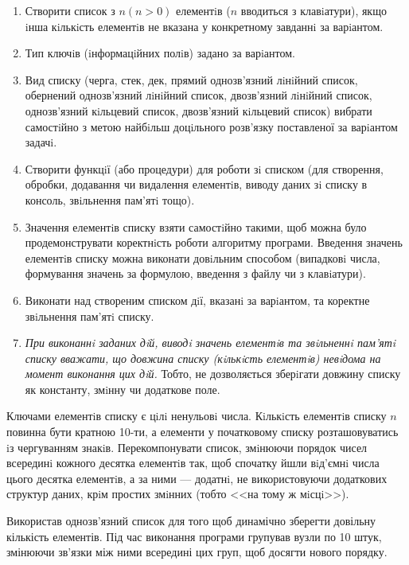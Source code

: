 
\def\basedir{/home/theammir/labs/asd/8/res}




\taskdesc%
\begin{enumerate}
  \item Створити список з $n (n > 0)$ елементiв ($n$ вводиться з клавiатури), якщо iнша кiлькiсть елементiв не вказана у конкретному завданнi за варiантом.
  \item Тип ключiв (iнформацiйних полiв) задано за варiантом.
  \item Вид списку (черга, стек, дек, прямий однозв’язний лiнiйний список, обернений однозв’язний лiнiйний список, 
    двозв’язний лiнiйний список, одно\-зв’язний кiльцевий список, двозв’язний кiльцевий список)
  вибрати самостiйно з метою найбiльш доцiльного розв’язку поставленої за варiантом задачi.
  \item Створити функцiї (або процедури) для роботи зi списком (для створення, обробки, додавання чи видалення елементiв, виводу даних зi списку в консоль, звiльнення пам’ятi тощо).
  \item Значення елементiв списку взяти самостiйно такими, щоб можна було продемонструвати коректнiсть роботи алгоритму програми.
    Введення значень елементiв списку можна виконати довiльним способом (випадковi числа, формування значень за формулою, введення з файлу чи з клавiатури).
  \item Виконати над створеним списком дiї, вказанi за варiантом, та коректне звiльнення пам’ятi списку.
  \item \emph{При виконаннi заданих дiй, виводi значень елементiв та звiльненнi пам’ятi списку вважати, що довжина списку (кiлькiсть елементiв)
    невiдома на момент виконання цих дiй.} Тобто, не дозволяється зберiгати довжину списку як константу, змiнну чи додаткове поле.
\end{enumerate}

\taskspec%
Ключами елементiв списку є цiлi ненульовi числа. Кiлькiсть елементiв списку $n$ повинна бути кратною 10-ти,
а елементи у початковому списку розташовуватись iз чергуванням знакiв.
Перекомпонувати список, змiнюючи порядок чисел всерединi кожного десятка елементiв так, щоб спочатку йшли вiд'ємнi числа
цього десятка елементiв, а за ними --- додатнi, не використовуючи додаткових структур даних, крiм простих змiнних
(тобто <<на тому ж мiсцi>>).


\tasktest%

\conclusion%
Використав однозв'язний список для того щоб динамічно зберегти довільну кількість елементів.
Під час виконання програми групував вузли по 10 штук, змінюючи зв'язки між ними всередині цих груп, щоб досягти нового порядку.



